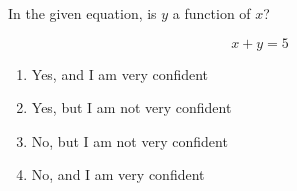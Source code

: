 \bigskip

\item In the given equation, is $y$ a function of $x$?

$$
x + y = 5
$$

\begin{enumerate}
\item Yes, and I am very confident  
\item Yes, but I am not very confident
\item No, but I am not very confident
\item No, and I am very confident  
\end{enumerate}

